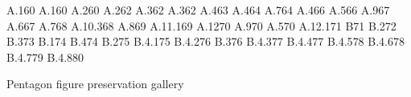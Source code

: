 \documentclass{amsart}
\def\tikzfig#1#2#3{%
\begin{figure}[htb]%
  \centering
\begin{tikzpicture}#3
\end{tikzpicture}
  \caption{#2}
  \label{fig:#1}%
\end{figure}%
}
\numberwithin{equation}{section}
\numberwithin{figure}{section}
\numberwithin{table}{section}
\theoremstyle{plain}
\theoremstyle{definition}
\theoremstyle{remark}
\begin{document}
\expandafter\def\csname r@fig:theta\endcsname{{A.1}{60}}
\expandafter\def\csname r@eqn:sym\endcsname{{A.1}{60}}
\expandafter\def\csname r@sec:xalpha\endcsname{{A.2}{60}}
\expandafter\def\csname r@fig:extended\endcsname{{A.2}{62}}
\expandafter\def\csname r@sec:banana\endcsname{{A.3}{62}}
\expandafter\def\csname r@fig:banana2\endcsname{{A.3}{62}}
\expandafter\def\csname r@sec:pet\endcsname{{A.4}{63}}
\expandafter\def\csname r@fig:p-triangle\endcsname{{A.4}{64}}
\expandafter\def\csname r@sec:shared\endcsname{{A.7}{64}}
\expandafter\def\csname r@eqn:abc\endcsname{{A.4}{66}}
\expandafter\def\csname r@fig:cord-delta\endcsname{{A.5}{66}}
\expandafter\def\csname r@sec:pinwheel\endcsname{{A.9}{67}}
\expandafter\def\csname r@fig:cord-pinwheel\endcsname{{A.6}{67}}
\expandafter\def\csname r@fig:cord-L\endcsname{{A.7}{68}}
\expandafter\def\csname r@sec:one-ljx\endcsname{{A.10.3}{68}}
\expandafter\def\csname r@fig:cord-T\endcsname{{A.8}{69}}
\expandafter\def\csname r@sec:one-tjx\endcsname{{A.11.1}{69}}
\expandafter\def\csname r@sec:pint\endcsname{{A.12}{70}}
\expandafter\def\csname r@fig:cord-pint\endcsname{{A.9}{70}}
\expandafter\def\csname r@lemma:0605\endcsname{{A.5}{70}}
\expandafter\def\csname r@sec:one-pintx\endcsname{{A.12.1}{71}}
\expandafter\def\csname r@appendix:cc\endcsname{{B}{71}}
\expandafter\def\csname r@sec:auto-diff\endcsname{{B.2}{72}}
\expandafter\def\csname r@sec:mitm\endcsname{{B.3}{73}}
\expandafter\def\csname r@eqn:assembly\endcsname{{B.1}{74}}
\expandafter\def\csname r@sec:calc-prep\endcsname{{B.4}{74}}
\expandafter\def\csname r@lemma:peripheral-o2c\endcsname{{B.2}{75}}
\expandafter\def\csname r@sec:pseudo1\endcsname{{B.4.1}{75}}
\expandafter\def\csname r@sec:pseudo2\endcsname{{B.4.2}{76}}
\expandafter\def\csname r@eqn:pseudo2-constraint\endcsname{{B.3}{76}}
\expandafter\def\csname r@sec:pseudo-area\endcsname{{B.4.3}{77}}
\expandafter\def\csname r@sec:pseudo-area3\endcsname{{B.4.4}{77}}
\expandafter\def\csname r@sec:dimer-isosc\endcsname{{B.4.5}{78}}
\expandafter\def\csname r@sec:large\endcsname{{B.4.6}{78}}
\expandafter\def\csname r@sec:pent3\endcsname{{B.4.7}{79}}
\expandafter\def\csname r@sec:pent4\endcsname{{B.4.8}{80}}
\makeatother
\renewcommand{\thefigure}{\currentfigurenumber}
\def\tikzfig#1#2#3{\begin{figure}[p]\centering\begin{tikzpicture}#3\end{tikzpicture}\caption{#2}\end{figure}}
\begin{center}\Large Pentagon figure preservation gallery\end{center}
\end{document}
